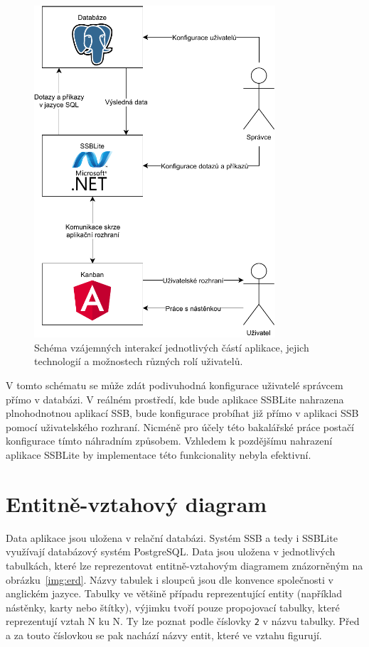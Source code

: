 \begin{figure}[H]
    \label{img:scheme}
	\centering
	\includegraphics[width=0.8\textwidth]{obrazky-figures/app-scheme.pdf}
	\caption{Schéma vzájemných interakcí jednotlivých částí aplikace, jejich technologií a možnostech různých rolí uživatelů.}
\end{figure}

V tomto schématu se může zdát podivuhodná konfigurace uživatelé správcem přímo v databázi. V reálném prostředí, kde bude aplikace SSBLite nahrazena plnohodnotnou aplikací SSB, bude konfigurace probíhat již přímo v aplikaci SSB pomocí uživatelského rozhraní. Nicméně pro účely této bakalářské práce postačí konfigurace tímto náhradním způsobem. Vzhledem k pozdějšímu nahrazení aplikace SSBLite by implementace této funkcionality nebyla efektivní.

\section{Entitně-vztahový diagram}\label{sec:erd}
Data aplikace jsou uložena v relační databázi. Systém SSB a tedy i SSBLite využívají databázový systém PostgreSQL. Data jsou uložena v jednotlivých tabulkách, které lze reprezentovat entitně-vztahovým diagramem znázorněným na obrázku~\ref{img:erd}. Názvy tabulek i sloupců jsou dle konvence společnosti v anglickém jazyce. Tabulky ve většině případu reprezentující entity (například nástěnky, karty nebo štítky), výjimku tvoří pouze propojovací tabulky, které reprezentují vztah N ku N. Ty lze poznat podle číslovky \texttt{2} v názvu tabulky. Před a za touto číslovkou se pak nachází názvy entit, které ve vztahu figurují.

